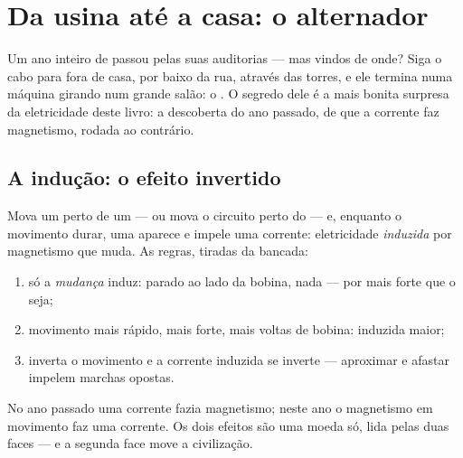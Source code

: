 \chapter{Da usina até a casa: o alternador}\label{ch:g9:alternator}

Um ano inteiro de  passou pelas suas auditorias ---
mas vindos de onde? Siga o cabo para fora de casa, por baixo da rua,
através das torres, e ele termina numa máquina girando num grande
salão: o . O segredo dele é a mais bonita surpresa da
eletricidade deste livro: a descoberta do ano passado, de que a
corrente faz magnetismo, rodada ao contrário.

\section{A indução: o efeito invertido}

\begin{proposition}\label{prop:g9:alternator:induction}
Mova um  perto de um  --- ou mova o circuito perto
do  --- e, enquanto o movimento durar, uma  aparece e impele
uma corrente: eletricidade \emph{induzida} por magnetismo que muda.
As regras, tiradas da bancada:
\begin{enumerate}
  \item só a \emph{mudança} induz:  parado ao lado da bobina,
        nada --- por mais forte que o  seja;
  \item movimento mais rápido,  mais forte, mais voltas de bobina:
         induzida maior;
  \item inverta o movimento e a corrente induzida se inverte ---
        aproximar e afastar impelem marchas opostas.
\end{enumerate}
No ano passado uma corrente fazia magnetismo; neste ano o magnetismo
em movimento faz uma corrente. Os dois efeitos são uma moeda só, lida
pelas duas faces --- e a segunda face move a civilização.
\end{proposition}

